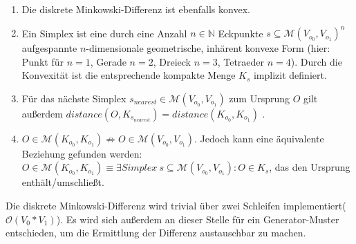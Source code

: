 \begin{enumerate}
		\item Die diskrete Minkowski-Differenz ist ebenfalls konvex.	
		\item Ein Simplex ist eine durch eine Anzahl $n\in\mathbb{N}$ Eckpunkte $s\subseteq\mathcal{M}(V_{o_0}, V_{o_1})^n$ aufgespannte $n$-dimensionale geometrische, inhärent konvexe Form (hier: Punkt für $n=1$, Gerade $n=2$, Dreieck $n=3$, Tetraeder $n=4$). Durch die Konvexität ist die entsprechende kompakte Menge $K_s$ implizit definiert.
		\item Für das nächste Simplex $s_{nearest} \in \mathcal{M}(V_{o_0}, V_{o_1})$ zum Ursprung $O$ gilt außerdem $distance(O, K_{s_{nearest}}) = distance(K_{o_0}, K_{o_1})$ \cite[p. 195]{gjk}. 
		\item $O \in \mathcal{M}(K_{o_0}, K_{o_1}) \nRightarrow O \in \mathcal{M}(V_{o_0}, V_{o_1})$. Jedoch kann eine äquivalente Beziehung gefunden werden: $O \in \mathcal{M}(K_{o_0}, K_{o_1}) \equiv \exists Simplex~s \subseteq \mathcal{M}(V_{o_0}, V_{o_1}) : O \in K_s$, das den Ursprung enthält/umschließt.

\end{enumerate}
Die diskrete Minkowski-Differenz wird trivial über zwei Schleifen implementiert($\mathcal{O}(V_0 * V_1)$). Es wird sich außerdem an dieser Stelle für ein Generator-Muster entschieden, um die Ermittlung der Differenz austauschbar zu machen.

